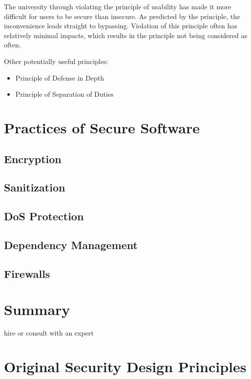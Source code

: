 The university through violating the principle of usability has made it more difficult for users to be secure than insecure.
As predicted by the principle, the inconvenience leads straight to bypassing.
Violation of this principle often has relatively minimal impacts,
which results in the principle not being considered as often.

\begin{drafting}

Other potentially useful principles:
\begin{itemize}
    \item Principle of Defense in Depth
    \item Principle of Separation of Duties
\end{itemize}

\section{Practices of Secure Software}

\subsection{Encryption}
\subsection{Sanitization}
\subsection{DoS Protection}
\subsection{Dependency Management}
\subsection{Firewalls}

\section{Summary}
hire or consult with an expert
\end{drafting}

\appendix
\section{Original Security Design Principles}\label{all-principles}

